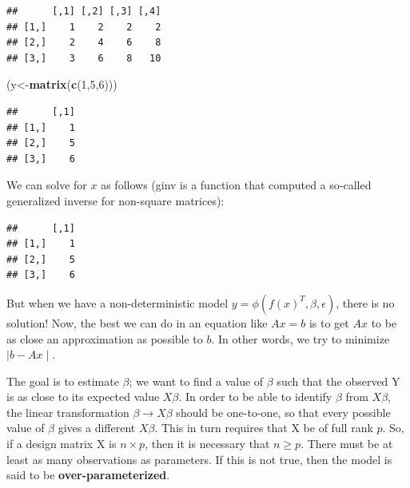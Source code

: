 \documentclass[12pt,]{krantz}
\newenvironment{Shaded}{\begin{snugshade}}{\end{snugshade}}
\newcommand{\CommentTok}[1]{\textcolor[rgb]{0.56,0.35,0.01}{\textit{#1}}}
\newcommand{\DecValTok}[1]{\textcolor[rgb]{0.00,0.00,0.81}{#1}}
\newcommand{\KeywordTok}[1]{\textcolor[rgb]{0.13,0.29,0.53}{\textbf{#1}}}
\newcommand{\NormalTok}[1]{#1}
\newcommand{\OperatorTok}[1]{\textcolor[rgb]{0.81,0.36,0.00}{\textbf{#1}}}
\begin{document}
\begin{verbatim}
##      [,1] [,2] [,3] [,4]
## [1,]    1    2    2    2
## [2,]    2    4    6    8
## [3,]    3    6    8   10
\end{verbatim}

\begin{Shaded}
\begin{Highlighting}[]
\NormalTok{(y<-}\KeywordTok{matrix}\NormalTok{(}\KeywordTok{c}\NormalTok{(}\DecValTok{1}\NormalTok{,}\DecValTok{5}\NormalTok{,}\DecValTok{6}\NormalTok{)))}
\end{Highlighting}
\end{Shaded}

\begin{verbatim}
##      [,1]
## [1,]    1
## [2,]    5
## [3,]    6
\end{verbatim}

We can solve for \(x\) as follows (ginv is a function that computed a so-called generalized inverse for non-square matrices):

\begin{Shaded}
\end{Shaded}

\begin{verbatim}
##      [,1]
## [1,]    1
## [2,]    5
## [3,]    6
\end{verbatim}

But when we have a non-deterministic model
\(y=\phi(f(x)^T,\beta,\epsilon)\), there is no solution! Now, the best we can do in an equation like \(Ax=b\) is to get \(Ax\) to be as close an approximation as possible to \(b\). In other words, we try to minimize \(\mid b-Ax\mid\).

The goal is to estimate \(\beta\); we want to find a value of \(\beta\) such that the observed Y is as close to its expected value \(X\beta\).
In order to be able to identify \(\beta\) from \(X\beta\), the linear transformation \(\beta \rightarrow X\beta\) should be one-to-one, so that every possible value of \(\beta\) gives a different \(X\beta\). This in turn requires that X be of full rank \(p\). So, if a design matrix X is \(n\times p\), then it is necessary that \(n\geq p\). There must be at least as many observations as parameters. If this is not true, then the model is said to be \textbf{over-parameterized}.
\end{document}
